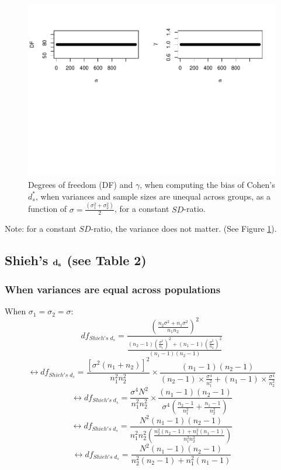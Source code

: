 \documentclass[
  english,
  man]{apa6}
\begin{document}
\begin{figure}
\centering
\includegraphics{Theoretical-Bias-of-all-estimators-as-a-function-of-population-parameters_files/figure-latex/biascohendprimehetunbalvariance2-1.pdf}
\caption{\label{fig:biascohendprimehetunbalvariance2}Degrees of freedom (DF) and \(\gamma\), when computing the bias of Cohen's \(d^*_s\), when variances and sample sizes are unequal across groups, as a function of \(\sigma= \frac{(\sigma_1^2+\sigma_2^2)}{2}\), for a constant \(SD\)-ratio.}
\end{figure}

Note: for a constant \(SD\)-ratio, the variance does not matter. (See Figure \ref{fig:biascohendprimehetunbalvariance2}).

\hypertarget{shiehs-bf-d_s-see-table-2}{%
\subsection{\texorpdfstring{Shieh's \(\bf d_s\) (see Table 2)}{Shieh's \textbackslash bf d\_s (see Table 2)}}\label{shiehs-bf-d_s-see-table-2}}

\hypertarget{when-variances-are-equal-across-populations-1}{%
\subsubsection{When variances are equal across populations}\label{when-variances-are-equal-across-populations-1}}

When \(\sigma_1=\sigma_2=\sigma\):
\[df_{Shieh's \; d_s} = \frac{\left( \frac{n_2\sigma^2+n_1\sigma^2}{n_1n_2}\right)^2}{\frac{(n_2-1)\left( \frac{\sigma^2}{n_1}\right)^2+(n_1-1)\left( \frac{\sigma^2}{n_2}\right)^2}{(n_1-1)(n_2-1)}}\]
\[\leftrightarrow df_{Shieh's \; d_s} = \frac{[\sigma^2(n_1+n_2)]^2}{n_1^2n_2^2} \times \frac{(n_1-1)(n_2-1)}{(n_2-1) \times  \frac{\sigma^4}{n_1^2}+(n_1-1) \times \frac{\sigma^4}{n_2^2}}\]
\[\leftrightarrow df_{Shieh's \; d_s} = \frac{\sigma^4N^2}{n_1^2n_2^2} \times \frac{(n_1-1)(n_2-1)}{\sigma^4 \left( \frac{n_2-1}{n^2_1}+\frac{n_1-1}{n^2_2}\right) }\]
\[\leftrightarrow df_{Shieh's \; d_s} = \frac{N^2(n_1-1)(n_2-1)}{n_1^2n_2^2 \left( \frac{n_2^2(n_2-1)+n_1^2(n_1-1)}{n_1^2n_2^2}\right)}\]
\[\leftrightarrow df_{Shieh's \; d_s} = \frac{N^2(n_1-1)(n_2-1)}{n_2^2(n_2-1)+n_1^2(n_1-1)}\]
\end{document}
